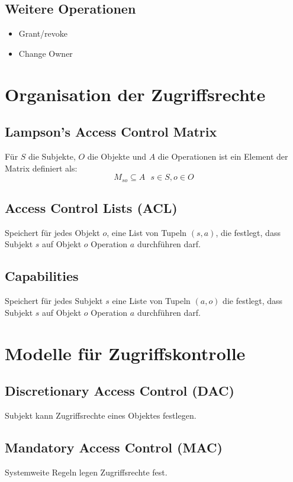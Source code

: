 \subsection{Weitere Operationen}
\begin{itemize}
    \item Grant/revoke
    \item Change Owner
\end{itemize}

\section{Organisation der Zugriffsrechte}
\subsection{Lampson's Access Control Matrix}
Für $S$ die Subjekte, $O$ die Objekte und $A$ die Operationen ist ein Element der Matrix
definiert als:
\begin{equation*}
    M_{so} \subseteq A\ \ \ s \in S, o \in O
\end{equation*}

\subsection{Access Control Lists (ACL)}
Speichert für jedes Objekt $o$, eine List von Tupeln $(s, a)$, die festlegt, dass Subjekt $s$ auf Objekt $o$ Operation $a$ durchführen darf.

\subsection{Capabilities}
Speichert für jedes Subjekt $s$ eine Liste von Tupeln $(a, o)$ die festlegt, dass Subjekt $s$ auf Objekt $o$ Operation $a$ durchführen darf.

\section{Modelle für Zugriffskontrolle}
\subsection{Discretionary Access Control (DAC)}
Subjekt kann Zugriffsrechte eines Objektes festlegen.

\subsection{Mandatory Access Control (MAC)}
Systemweite Regeln legen Zugriffsrechte fest.

